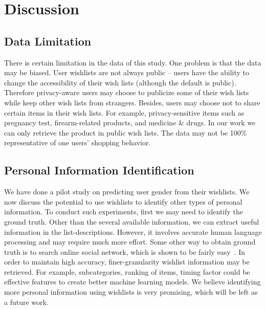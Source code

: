 \section{Discussion}
\subsection{Data Limitation}
There is certain limitation in the data of this study. One problem is that the data may be biased. User wishlists are not always public -- users have the ability to change the accessibility of their wish lists (although the default is public). Therefore privacy-aware users may choose to publicize some of their wish lists while keep other wish lists from strangers. Besides, users may choose not to share certain items in their wish lists. For example, privacy-sensitive items such as pregnancy test, firearm-related products, and medicine \& drugs. In our work we can only retrieve the product in public wish lists. The data may not be 100\% representative of one users' shopping behavior.

\subsection{Personal Information Identification}
We have done a pilot study on predicting user gender from their wishlists. We now discuss the potential to use wishlists to identify other types of personal information. To conduct such experiments, first we may need to identify the ground truth. Other than the several available information, we can extract useful information in the list-descriptions. However, it involves accurate human language processing and may require much more effort. Some other way to obtain ground truth is to search online social network, which is shown to be fairly easy~\cite{krishnamurthy2009leakage}. In order to maintain high accuracy, finer-granularity wishlist information may be retrieved. For example, subcategories, ranking of items, timing factor could be effective features to create better machine learning models. We believe identifying more personal information using wishlists is very promising, which will be left as a future work. 

